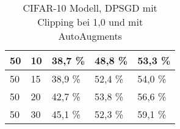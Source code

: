 \begin{table}[!htb]
\begin{tabular}{lllll}
\multicolumn{1}{|l|}{50}                                                     & \multicolumn{1}{l|}{10}                                                                & \multicolumn{1}{l|}{38,7 \%}                                                                                           & \multicolumn{1}{l|}{48,8 \%}                                                                                            & \multicolumn{1}{l|}{53,3 \%}                                                                                            \\ \hline
\multicolumn{1}{|l|}{50}                                                     & \multicolumn{1}{l|}{15}                                                                & \multicolumn{1}{l|}{38,9 \%}                                                                                           & \multicolumn{1}{l|}{52,4 \%}                                                                                            & \multicolumn{1}{l|}{54,0 \%}                                                                                            \\ \hline
\multicolumn{1}{|l|}{50}                                                     & \multicolumn{1}{l|}{20}                                                                & \multicolumn{1}{l|}{42,7 \%}                                                                                           & \multicolumn{1}{l|}{53,8 \%}                                                                                            & \multicolumn{1}{l|}{56,6 \%}                                                                                            \\ \hline
\multicolumn{1}{|l|}{50}                                                     & \multicolumn{1}{l|}{30}                                                                & \multicolumn{1}{l|}{45,1 \%}                                                                                           & \multicolumn{1}{l|}{52,3 \%}                                                                                            & \multicolumn{1}{l|}{59,1 \%}                                                                                            \\ \hline
\end{tabular}
\caption{CIFAR-10 Modell, DPSGD mit Clipping bei 1,0 und mit AutoAugments}
\label{tab:c10_exp1}
\end{table}
